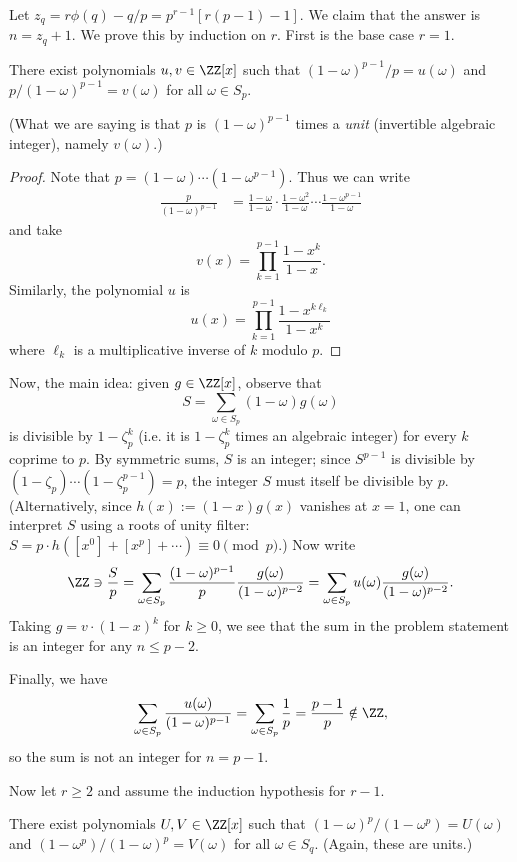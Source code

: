 \documentclass[11pt]{scrartcl}
\begin{document}
Let $z_q=r\phi(q)-q/p=p^{r-1}[r(p-1)-1]$. We claim that the answer is $n =
z_q+1$.  We prove this by induction on $r$. First is the base case $r=1$.

\begin{lemma*}
  There exist polynomials $u,v\in \ZZ[x]$ such that
  $(1-\omega)^{p-1}/p = u(\omega)$ and $p/(1-\omega)^{p-1} = v(\omega)$ for all
  $\omega\in S_p$.

  (What we are saying is that $p$ is $(1-\omega)^{p-1}$ times a \emph{unit}
  (invertible algebraic integer), namely $v(\omega)$.)
\end{lemma*}

\begin{proof}
  Note that $p = (1-\omega)\dotsm(1-\omega^{p-1})$. Thus we can write
  \begin{align*}
    \frac{p}{(1-\omega)^{p-1}} &=
    \frac{1-\omega}{1-\omega} \cdot\frac{1-\omega^2}{1-\omega} \dotsm
    \frac{1-\omega^{p-1}}{1-\omega}
  \end{align*}
  and take
  \[v(x)=\prod_{k=1}^{p-1}\frac{1-x^{k}}{1-x}.\]
  Similarly, the polynomial $u$ is
  \[u(x) = \prod_{k=1}^{p-1}\frac{1-x^{k\ell_k}}{1-x^k}\]
  where $\ell_k$ is a multiplicative inverse of $k$ modulo $p$.
\end{proof}

Now, the main idea: given $g\in \ZZ[x]$, observe that \[S = \sum_{\omega
\in S_p} (1-\omega)g(\omega)\] is divisible by $1-\zeta_p^k$ (i.e. it is
$1-\zeta_p^k$ times an algebraic integer) for every $k$ coprime to $p$.  By
symmetric sums, $S$ is an integer; since $S^{p-1}$ is divisible by
$(1-\zeta_p)\dotsm(1-\zeta_p^{p-1}) = p$, the integer $S$ must itself be
divisible by $p$. (Alternatively, since $h(x) := (1-x)g(x)$ vanishes at
$x=1$, one can interpret $S$ using a roots of unity filter: $S = p\cdot h([x^0]
+ [x^p] + \dotsb) \equiv 0\pmod{p}$.) Now write
\[
\ZZ
\ni \frac{S}{p}
= \sum_{\omega \in S_p} \frac{(1-\omega)^{p-1}}{p} \frac{g(\omega)}{(1-\omega)^{p-2}}
= \sum_{\omega \in S_p} u(\omega)\frac{g(\omega)}{(1-\omega)^{p-2}}.
\]
Taking $g = v\cdot (1-x)^k$ for $k\geq 0$, we see that the sum in the
problem statement is an integer for any $n\leq p-2$.

Finally, we have
\[\sum_{\omega\in S_p}\frac{u(\omega)}{(1-\omega)^{p-1}}=\sum_{\omega\in
S_p}\frac{1}{p}=\frac{p-1}{p}\notin\ZZ,\]
so the sum is not an integer for $n=p-1$.

Now let $r\ge2$ and assume the induction hypothesis for $r-1$.

\begin{lemma*}
  There exist polynomials $U,V\in \ZZ[x]$ such that
  $(1-\omega)^p/(1-\omega^p) = U(\omega)$ and $(1-\omega^p)/(1-\omega)^p =
  V(\omega)$ for all $\omega\in S_q$. (Again, these are units.)
\end{lemma*}
\end{document}
